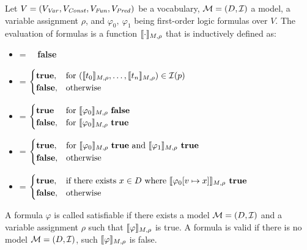 \begin{mydef}
		Let $V = (V_{\mathit{Var}}, V_{\mathit{Const}}, V_{\mathit{Fun}}, V_{\mathit{Pred}})$ be a vocabulary, $\mathcal{M} = (D, \mathcal{I})$ a model, a variable assignment $\rho$, and $\varphi_0,\  \varphi_1$ being first-order logic formulas over $V$. The evaluation of formulas is a function $\llbracket \cdot \rrbracket_{M, \rho}$ that is inductively defined as: \\
		\begin{itemize}
			\item {\makebox[3.5cm]{$\eval{\bot} = \hfill$}} = \ \ \textbf{false}
			\item {} =
				$
				\begin{cases}
					\textbf{true}, & \text{for } (\llbracket t_0 \rrbracket_{M, \rho}, \ldots, \llbracket t_n \rrbracket_{M, \rho}) \in \mathcal{I}(p)\\
					\textbf{false}, & \text{otherwise}
				\end{cases}
				$
			\item {} =
				$
				\begin{cases}
					\textbf{true} & \text{for } \llbracket \varphi_0 \rrbracket_{M, \rho} \text{ \textbf{false}}\\
					\textbf{false}, & \text{for } \llbracket \varphi_0 \rrbracket_{M, \rho} \text{ \textbf{true}}\\
				\end{cases}
				$
			\item {} =
				$
				\begin{cases}
					\textbf{true}, & \text{for } \llbracket \varphi_0 \rrbracket_{M, \rho} \text{ \textbf{true} and } \llbracket \varphi_1 \rrbracket_{M, \rho} \textbf{ true} \\
					\textbf{false}, & \text{otherwise} \\
				\end{cases}
				$
			\item {} =
				$
				\begin{cases}
					\textbf{true}, & \text{if there exists } x \in D \text{ where } \llbracket \varphi_0 [v \mapsto x] \rrbracket_{M, \rho} \textbf{ true} \\
					\textbf{false}, & \text{otherwise} \\
				\end{cases}
				$
		\end{itemize}
\end{mydef}
A formula $\varphi$ is called satisfiable if there exists a model $\mathcal{M} = (D, \mathcal{I})$ and a variable assignment $\rho$ such that $\llbracket \varphi \rrbracket_{M, \rho}$ is true. A formula is valid if there is no model $\mathcal{M} = (D, \mathcal{I})$, such $\llbracket \varphi \rrbracket_{M, \rho}$ is false.
